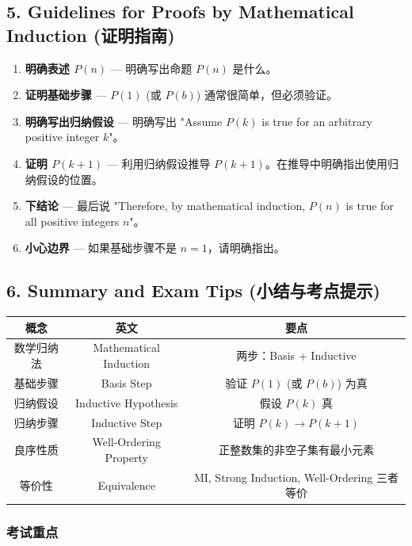 \documentclass[10pt,a4paper,openany]{ctexbook}
\theoremstyle{definition}
\theoremstyle{remark}
\begin{document}
\subsection{5. Guidelines for Proofs by Mathematical Induction (证明指南)}

\begin{enumerate}
\item \textbf{明确表述 $P(n)$} — 明确写出命题 $P(n)$ 是什么。
\item \textbf{证明基础步骤} — $P(1)$ (或 $P(b)$) 通常很简单，但必须验证。
\item \textbf{明确写出归纳假设} — 明确写出 "Assume $P(k)$ is true for an arbitrary positive integer $k$"。
\item \textbf{证明 $P(k+1)$} — 利用归纳假设推导 $P(k+1)$。在推导中明确指出使用归纳假设的位置。
\item \textbf{下结论} — 最后说 "Therefore, by mathematical induction, $P(n)$ is true for all positive integers $n$"。
\item \textbf{小心边界} — 如果基础步骤不是 $n=1$，请明确指出。

\end{enumerate}

\vspace{-2pt}

\subsection{6. Summary and Exam Tips (小结与考点提示)}

\begin{center}
\begin{tabular}{ccc}
\hline
概念 & 英文 & 要点 \\ \hline
数学归纳法 & Mathematical Induction & 两步：Basis + Inductive \\
基础步骤 & Basis Step & 验证 $P(1)$ (或 $P(b)$) 为真 \\
归纳假设 & Inductive Hypothesis & 假设 $P(k)$ 真 \\
归纳步骤 & Inductive Step & 证明 $P(k) \to P(k+1)$ \\
良序性质 & Well-Ordering Property & 正整数集的非空子集有最小元素 \\
等价性 & Equivalence & MI, Strong Induction, Well-Ordering 三者等价 \\
\hline
\end{tabular}

\end{center}

\subsubsection{考试重点}
\end{document}

